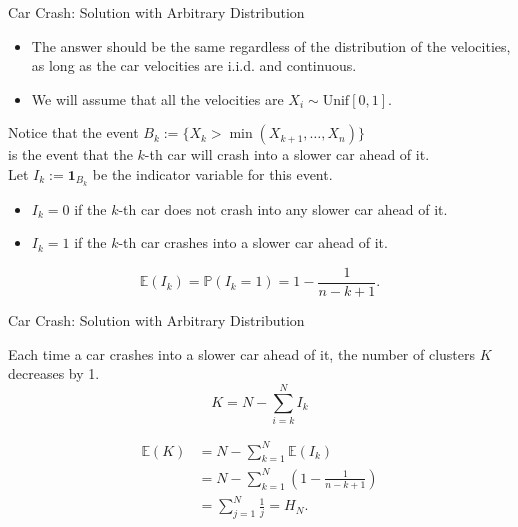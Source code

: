 \begin{frame}{Car Crash: Solution with Arbitrary Distribution}
  \begin{itemize}
    \item The answer should be the same regardless of the distribution of the velocities,\\
    as long as the car velocities are i.i.d. and continuous.\\
    \item We will assume that all the velocities are $X_i \sim \mathrm{Unif}[0,1]$.
  \end{itemize}

  \vspace{0.3cm}

  Notice that the event $B_k := \{X_k > \min (X_{k+1}, \dots, X_n)\}$\\
  is the event that the $k$-th car will crash into a slower car ahead of it.\\
  Let $I_k := \mathbf{1}_{B_k}$ be the indicator variable for this event.
  \begin{itemize}
    \item $I_k = 0$ if the $k$-th car does not crash into any slower car ahead of it.
    \item $I_k = 1$ if the $k$-th car crashes into a slower car ahead of it.
  \end{itemize}
  \begin{sqt:result}
    $$\mathbb E(I_k) = \mathbb P(I_k = 1) = 1 - \frac{1}{n-k+1}.$$
  \end{sqt:result}
\end{frame}

\begin{frame}{Car Crash: Solution with Arbitrary Distribution}
  \begin{sqt:result}
    Each time a car crashes into a slower car ahead of it, the number of clusters $K$ decreases by 1.
    $$K = N - \sum_{i=k}^N I_k$$
  \end{sqt:result}

  \begin{align*}
    \mathbb E(K)
    &= N - \sum_{k=1}^N \mathbb E(I_k) \\
    &= N - \sum_{k=1}^N \left(1-\frac{1}{n-k+1} \right)\\
    &= \sum_{j=1}^N \frac{1}{j} = H_N.
  \end{align*}
\end{frame}


